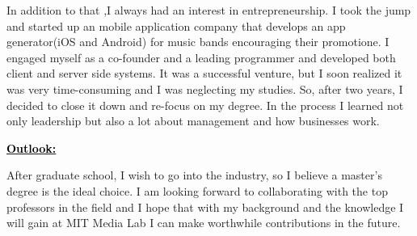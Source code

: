 \documentclass{article}
\newcommand{\statement}[1]{\par\medskip
  \underline{\textcolor{black}{\textbf{#1:}}}\space
}
\begin{document}
In addition to that ,I always had an interest in entrepreneurship. I took the jump and started up an mobile application company that develops an app generator(iOS and Android) for music bands encouraging their promotione. I engaged myself as a co-founder and a leading programmer and developed both client and server side systems. It was a successful venture, but I soon realized it was very time-consuming and I was neglecting my studies. So, after two years, I decided to close it down and re-focus on my degree. In the process I learned not only leadership but also a lot about management and how businesses work.


\statement{Outlook}

After graduate school, I wish to go into the industry, so I believe a master's degree is the ideal choice. I am looking forward to collaborating with the top professors in the field and I hope that with my background and the knowledge I will gain at MIT Media Lab I can make worthwhile contributions in the future.
\end{document}
